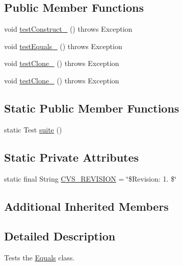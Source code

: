 \subsection*{Public Member Functions}
\begin{DoxyCompactItemize}
\item 
void \hyperlink{classorg_1_1jgap_1_1gp_1_1function_1_1_equals_test_aa8f32335237df84a09d682ac79230fb8}{test\-Construct\-\_} ()  throws Exception 
\item 
void \hyperlink{classorg_1_1jgap_1_1gp_1_1function_1_1_equals_test_ae696985de7dcbb2e034e7c1634e2a1ee}{test\-Equals\-\_} ()  throws Exception 
\item 
void \hyperlink{classorg_1_1jgap_1_1gp_1_1function_1_1_equals_test_abcbb0438223b95419bdf20bd10fb5193}{test\-Clone\-\_} ()  throws Exception 
\item 
void \hyperlink{classorg_1_1jgap_1_1gp_1_1function_1_1_equals_test_a236999dbf47a9c21ec9d5a7ba41eca98}{test\-Clone\-\_} ()  throws Exception 
\end{DoxyCompactItemize}
\subsection*{Static Public Member Functions}
\begin{DoxyCompactItemize}
\item 
static Test \hyperlink{classorg_1_1jgap_1_1gp_1_1function_1_1_equals_test_ad8dabf4bfa3565b813e78fc96cde7203}{suite} ()
\end{DoxyCompactItemize}
\subsection*{Static Private Attributes}
\begin{DoxyCompactItemize}
\item 
static final String \hyperlink{classorg_1_1jgap_1_1gp_1_1function_1_1_equals_test_ac12eefe89a387a89ebca396433e84525}{C\-V\-S\-\_\-\-R\-E\-V\-I\-S\-I\-O\-N} = \char`\"{}\$Revision\-: 1. \$\char`\"{}
\end{DoxyCompactItemize}
\subsection*{Additional Inherited Members}


\subsection{Detailed Description}
Tests the \hyperlink{classorg_1_1jgap_1_1gp_1_1function_1_1_equals}{Equals} class.

